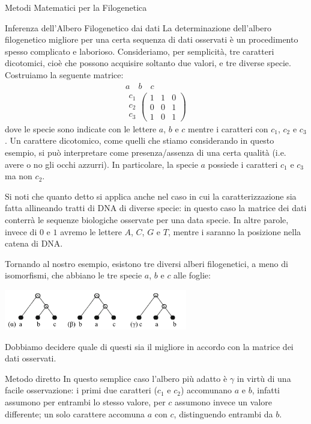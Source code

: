 \documentclass{article}
\begin{document}
\begin{section}{Metodi Matematici per la Filogenetica}
		\begin{subsection}{Inferenza dell’Albero Filogenetico dai dati}
			La determinazione dell’albero filogenetico migliore per una certa sequenza di dati osservati è un procedimento spesso complicato e laborioso.
			Consideriamo, per semplicità, tre caratteri dicotomici, cioè che possono acquisire soltanto due valori, e tre diverse specie. Costruiamo la seguente matrice:
			\begin{align*}
				 a \quad   b \quad   c \quad \; \\
				\begin{array}{c}
					c_1 \\ c_2 \\ c_3
				\end{array}
				\left(
				\begin{array}{ccc}
					1 & 1 & 0 \\
					0 & 0 & 1 \\
					1 & 0 & 1
				\end{array} \right)
			\end{align*}
			dove le specie sono indicate con le lettere $a$, $b$ e $c$ mentre i caratteri con $c_1$, $c_2$ e $c_3$. 
			Un carattere dicotomico, come quelli che stiamo considerando in questo esempio, si può interpretare come presenza/assenza di una certa qualità (i.e. avere o no gli occhi azzurri). In particolare, la specie $a$ possiede i caratteri $c_1$ e $c_3$ ma non $c_2$.
			
			Si noti che quanto detto si applica anche nel caso in cui la caratterizzazione sia fatta allineando tratti di DNA di diverse specie: in questo caso la matrice dei dati conterrà le sequenze biologiche osservate per una data specie. In altre parole, invece di $0$ e $1$ avremo le lettere $A$, $C$, $G$ e $T$, mentre i  saranno la posizione nella catena di DNA.
			
			Tornando al nostro esempio, esistono tre diversi alberi filogenetici, a meno di isomorfismi, che abbiano le tre specie $a$, $b$ e $c$ alle foglie:
			\begin{center}
				\includegraphics[width=0.6\textwidth]{Pics/alberi1.png}
			\end{center}
			Dobbiamo decidere quale di questi sia il migliore in accordo con la matrice dei dati osservati.
			\begin{subsubsection}{Metodo diretto}
				In questo semplice caso l’albero più adatto è $\gamma$ in virtù di una facile osservazione: i primi due caratteri ($c_1$ e $c_2$) accomunano $a$ e $b$, infatti assumono per entrambi lo stesso valore, per $c$ assumono invece un valore differente; un solo carattere accomuna $a$ con $c$, distinguendo entrambi da $b$. 
				

\end{subsubsection}
\end{subsection}
\end{section}
\end{document}

